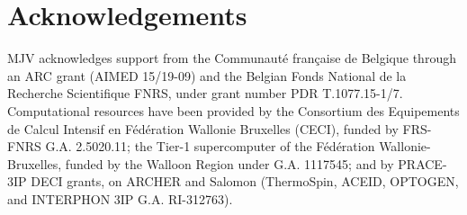 \documentclass[final,5p,times,twocolumn,sort&compress]{elsarticle}
\begin{document}
\section{Acknowledgements}
MJV acknowledges support from the Communaut\'e fran\c{c}aise de Belgique through an ARC grant (AIMED 15/19-09) and the Belgian Fonds National de la Recherche Scientifique FNRS, under grant number PDR T.1077.15-1/7. 
%
Computational resources have been provided by the Consortium des Equipements de Calcul Intensif en F\'{e}d\'{e}ration Wallonie Bruxelles (CECI), funded by FRS-FNRS G.A. 2.5020.11; the Tier-1 supercomputer of the F\'{e}d\'{e}ration Wallonie-Bruxelles, funded by the Walloon Region under G.A. 1117545; and by PRACE-3IP DECI grants, on ARCHER and Salomon (ThermoSpin, ACEID, OPTOGEN, and INTERPHON 3IP G.A. RI-312763).



  
\end{document}
